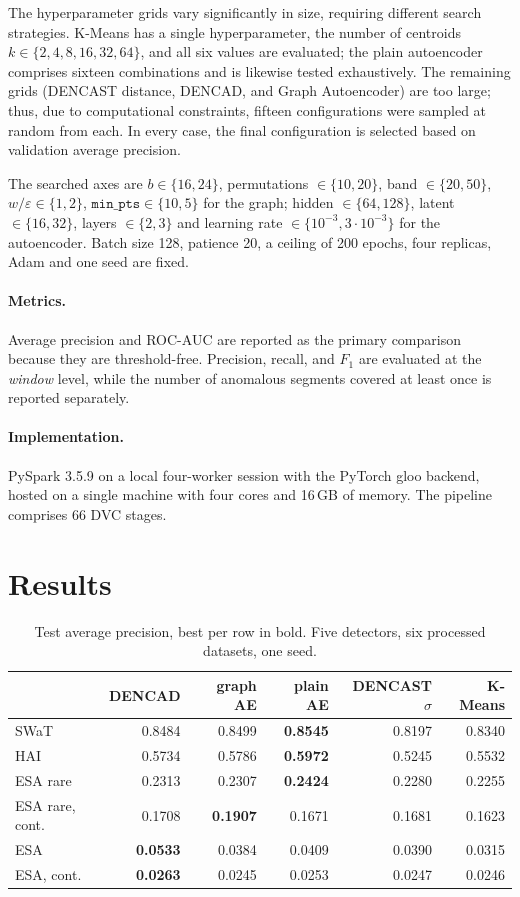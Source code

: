 \documentclass{article}
\begin{document}
The hyperparameter grids vary significantly in size, requiring different search strategies. 
K-Means has a single hyperparameter, the number of centroids $k \in \{2, 4, 8, 16, 32, 64\}$, and 
all six values are evaluated; the plain autoencoder comprises sixteen combinations and is 
likewise tested exhaustively. The remaining grids (DENCAST distance, DENCAD, and Graph Autoencoder) 
are too large; thus, due to computational constraints, fifteen configurations were sampled 
at random from each. In every case, the final configuration is selected based on validation average precision.

The searched axes are $b \in \{16, 24\}$, permutations $\in \{10, 20\}$, band
$\in \{20, 50\}$, $w/\varepsilon \in \{1, 2\}$, $\texttt{min\_pts} \in \{10, 5\}$ for the
graph; hidden $\in \{64, 128\}$, latent $\in \{16, 32\}$, layers $\in \{2, 3\}$ and
learning rate $\in \{10^{-3}, 3\cdot 10^{-3}\}$ for the autoencoder. Batch size 128, patience 20, a ceiling
of 200 epochs, four replicas, Adam and one seed are fixed.

\paragraph{Metrics.} Average precision and ROC-AUC are reported as the primary comparison
because they are threshold-free. Precision, recall, and $F_1$ are evaluated at the
\emph{window} level, while the number of anomalous segments covered at
least once is reported separately.

\paragraph{Implementation.} PySpark 3.5.9 on a local four-worker session with the PyTorch 
gloo backend, hosted on a single machine with four cores and 16\,GB of memory. 
The pipeline comprises 66 DVC stages.

\section{Results}

\begin{table}[t]
  \centering
  \small
  \caption{Test average precision, best per row in bold. Five detectors, six processed
  datasets, one seed.}
  \begin{tabular}{lrrrrr}
    \toprule
    & DENCAD & graph AE & plain AE & DENCAST $\sigma$ & K-Means \\
    \midrule
SWaT & 0.8484 & 0.8499 & \textbf{0.8545} & 0.8197 & 0.8340 \\
HAI & 0.5734 & 0.5786 & \textbf{0.5972} & 0.5245 & 0.5532 \\
ESA rare & 0.2313 & 0.2307 & \textbf{0.2424} & 0.2280 & 0.2255 \\
ESA rare, cont. & 0.1708 & \textbf{0.1907} & 0.1671 & 0.1681 & 0.1623 \\
ESA & \textbf{0.0533} & 0.0384 & 0.0409 & 0.0390 & 0.0315 \\
ESA, cont. & \textbf{0.0263} & 0.0245 & 0.0253 & 0.0247 & 0.0246 \\
    \bottomrule
  \end{tabular}
  \label{tab:ap}
\end{table}
\end{document}
